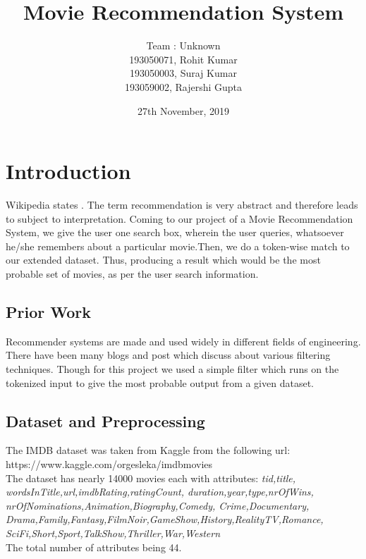 \documentclass{article}
\title{\textbf{\Huge{Movie Recommendation System}}}
\author{\vspace{1cm}
\huge{Team : Unknown}\\
\large{193050071, Rohit Kumar}\\
\large{193050003, Suraj Kumar}\\
\large{193059002, Rajershi Gupta}
}
\date{27th November, 2019 }
\begin{document}
    \maketitle
    \newpage
	\tableofcontents
	\setcounter{page}{1}
	\newpage
\section{Introduction}
    Wikipedia states . The term recommendation is very abstract and therefore leads to subject to interpretation. Coming to our project of a Movie Recommendation System, we give the user one search box, wherein the user queries, whatsoever he/she remembers about a particular movie.Then, we do a token-wise match to our extended dataset. Thus, producing a
result which would be the most probable set of movies, as per the user search information.

\subsection{Prior Work}
    Recommender systems are made and used widely in different fields of engineering. There have been many blogs and post  which discuss about various filtering techniques. Though for this project we used a simple filter which runs on the tokenized input to give the most probable output from a given dataset. 
\subsection{Dataset and Preprocessing}
    The IMDB dataset was taken from Kaggle from the following url:\\
    https://www.kaggle.com/orgesleka/imdbmovies\\
    The dataset has nearly 14000 movies each with attributes:
    \textit{tid,title,\\wordsInTitle,url,imdbRating,ratingCount,
    duration,year,type,nrOfWins,\\nrOfNominations,Animation,Biography,Comedy,
    Crime,Documentary,\\Drama,Family,Fantasy,FilmNoir,GameShow,History,RealityTV,Romance,\\SciFi,Short,Sport,TalkShow,Thriller,War,Western}\\
    The total number of attributes being 44. 
    
\end{document}
